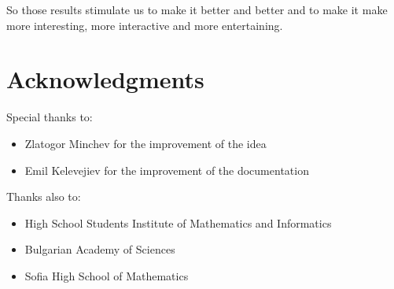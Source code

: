 \documentclass[a4paper, 12pt]{article}
\begin{document}
	So those results stimulate us to make it better and better and to make it make more interesting, more interactive and more entertaining.
 	\section{Acknowledgments}
 	 	 Special thanks to:
 	 	 \begin{itemize}
 	 	 	\item Zlatogor Minchev for the improvement of the idea
 	 	 	\item Emil Kelevejiev for the improvement of the documentation
 	 	 \end{itemize}
 	 	 Thanks also to:
 	 	 \begin{itemize}
 	 	 	\item High School Students Institute of Mathematics and Informatics
 	 	 	\item Bulgarian Academy of Sciences
 	 	 	\item Sofia High School of Mathematics
 	 	 \end{itemize}
\end{document}
